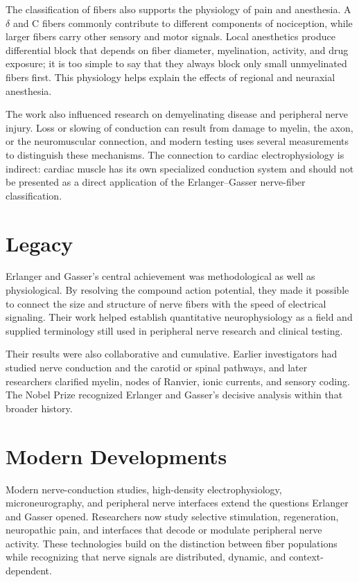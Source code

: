 The classification of fibers also supports the physiology of pain and anesthesia. A$\delta$ and C fibers commonly contribute to different components of nociception, while larger fibers carry other sensory and motor signals. Local anesthetics produce differential block that depends on fiber diameter, myelination, activity, and drug exposure; it is too simple to say that they always block only small unmyelinated fibers first. This physiology helps explain the effects of regional and neuraxial anesthesia.

The work also influenced research on demyelinating disease and peripheral nerve injury. Loss or slowing of conduction can result from damage to myelin, the axon, or the neuromuscular connection, and modern testing uses several measurements to distinguish these mechanisms. The connection to cardiac electrophysiology is indirect: cardiac muscle has its own specialized conduction system and should not be presented as a direct application of the Erlanger--Gasser nerve-fiber classification.

\section{Legacy}

Erlanger and Gasser's central achievement was methodological as well as physiological. By resolving the compound action potential, they made it possible to connect the size and structure of nerve fibers with the speed of electrical signaling. Their work helped establish quantitative neurophysiology as a field and supplied terminology still used in peripheral nerve research and clinical testing.

Their results were also collaborative and cumulative. Earlier investigators had studied nerve conduction and the carotid or spinal pathways, and later researchers clarified myelin, nodes of Ranvier, ionic currents, and sensory coding. The Nobel Prize recognized Erlanger and Gasser's decisive analysis within that broader history.

\section{Modern Developments}

Modern nerve-conduction studies, high-density electrophysiology, microneurography, and peripheral nerve interfaces extend the questions Erlanger and Gasser opened. Researchers now study selective stimulation, regeneration, neuropathic pain, and interfaces that decode or modulate peripheral nerve activity. These technologies build on the distinction between fiber populations while recognizing that nerve signals are distributed, dynamic, and context-dependent.

